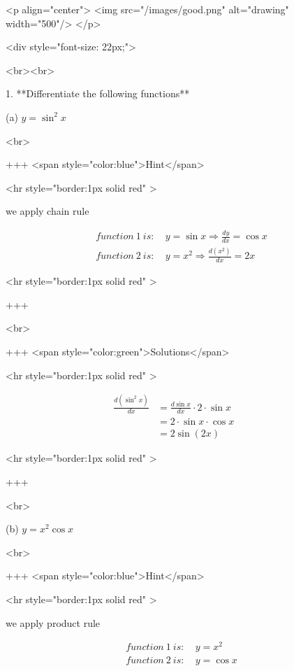 <p align="center">
<img src="/images/good.png" alt="drawing" width="500"/>
</p>

<div style="font-size: 22px;">

<br><br>

1. **Differentiate the following functions**

(a) $y=\sin ^{2} x$

<br>

+++ <span style="color:blue">Hint</span>

<hr style="border:1px solid red" >

we apply chain rule

\begin{equation}
\begin{aligned}
function\ 1\ is:\ &y=\sin x \Rightarrow \frac{d y}{d x}=\cos x \\
function\ 2\ is:\ &y=x^2 \Rightarrow \frac{d\left(x^2\right)}{d x}=2 x
\end{aligned}
\end{equation}

<hr style="border:1px solid red" >

+++

<br>

+++ <span style="color:green">Solutions</span>

<hr style="border:1px solid red" >

\begin{equation}
\begin{aligned}
\frac{d\left(\sin ^2 x\right)}{d x} &= \frac{d \sin x }  {d x} \cdot 2 \cdot \sin x \\
&=2 \cdot \sin x \cdot \cos x \\
&=2 \sin (2 x)&&
\end{aligned}
\end{equation}

<hr style="border:1px solid red" >

+++

<br>

(b) $y=x^{2} \cos x$

<br>

+++ <span style="color:blue">Hint</span>

<hr style="border:1px solid red" >

we apply product rule

\begin{equation}
\begin{aligned}
function\ 1\ is:\ &y=x^2 \\
function\ 2\ is:\ &y=\cos x \\
\end{aligned}
\end{equation}

